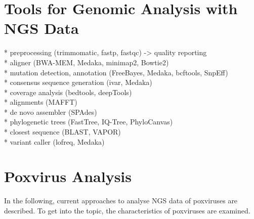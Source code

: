 \section{Tools for Genomic Analysis with NGS Data}
* preprocessing (trimmomatic, fastp, fastqc) -> quality reporting \\
* aligner (BWA-MEM, Medaka, minimap2, Bowtie2) \\
* mutation detection, annotation (FreeBayes, Medaka, bcftools, SnpEff) \\
* consensus sequence generation (ivar, Medaka) \\
* coverage analysis (bedtools, deepTools) \\
* alignments (MAFFT) \\
* de novo assembler (SPAdes) \\
* phylogenetic trees (FastTree, IQ-Tree, PhyloCanvas) \\
* closest sequence (BLAST, VAPOR) \\
* variant caller (lofreq, Medaka)

\section{Poxvirus Analysis}\label{sec:2-pox}
In the following, current approaches to analyse \ac{NGS} data of poxviruses are described. To get into the topic, the characteristics of poxviruses are examined.


